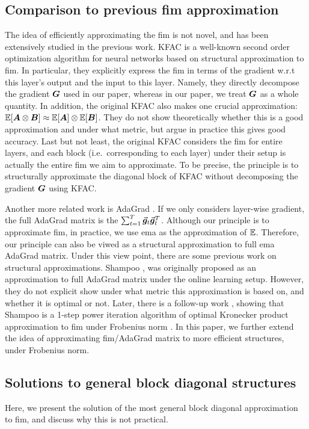 \subsection{Comparison to previous \gls{fim} approximation}
\label{subapp: comparison to previous work}
The idea of efficiently approximating the \gls{fim} is not novel, and has been extensively studied in the previous work. KFAC \citep{martens2015optimizing} is a well-known second order optimization algorithm for neural networks based on structural approximation to \gls{fim}. In particular, they explicitly express the \gls{fim} in terms of the gradient w.r.t this layer's output and the input to this layer. Namely, they directly decompose the gradient ${\bm{G}}$ used in our paper, whereas in our paper, we treat ${\bm{G}}$ as a whole quantity. In addition, the original KFAC also makes one crucial approximation: $\mathbb{E}[{\bm{A}}\otimes {\bm{B}}]\approx \mathbb{E}[{\bm{A}}]\otimes \mathbb{E}[{\bm{B}}]$. They do not show theoretically whether this is a good approximation and under what metric, but argue in practice this gives good accuracy. Last but not least, the original KFAC considers the \gls{fim} for entire layers, and each block (i.e.~corresponding to each layer) under their setup is actually the entire \gls{fim} we aim to approximate. To be precise, the principle is to structurally approximate the diagonal block of KFAC without decomposing the gradient ${\bm{G}}$ using KFAC. 

Another more related work is AdaGrad \citep{duchi2011adaptive}. If we only considers layer-wise gradient, the full AdaGrad matrix is the $\sum_{t=1}^T\vec{\bm{g}}_t\vec{\bm{g}}_t^T$. Although our principle is to approximate \gls{fim}, in practice, we use \gls{ema} as the approximation of $\mathbb{E}$. Therefore, our principle can also be viwed as a structural approximation to full \gls{ema} AdaGrad matrix. Under this view point, there are some previous work on structural approximations. Shampoo \citep{gupta2018shampoo}, was originally proposed as an approximation to full AdaGrad matrix under the online learning setup. However, they do not explicit show under what metric this approximation is based on, and whether it is optimal or not. Later, there is a follow-up work \citep{morwani2024new}, showing that Shampoo is a 1-step power iteration algorithm of optimal Kronecker product approximation to \gls{fim} under Frobenius norm \citep{koroko2022efficient}. In this paper, we further extend the idea of approximating \gls{fim}/AdaGrad matrix to more efficient structures, under Frobenius norm. 

\subsection{Solutions to general block diagonal structures}
\label{subapp: solution to general block diagonal}
Here, we present the solution of the most general block diagonal approximation to \gls{fim}, and discuss why this is not practical. 

